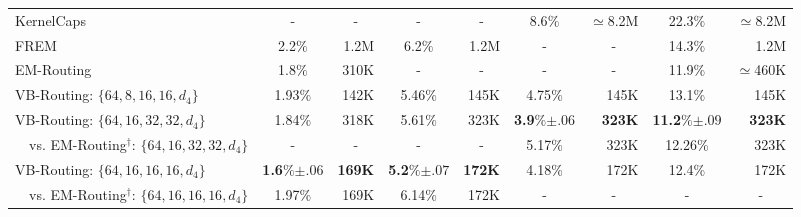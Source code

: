 \documentclass[letterpaper]{article} \usepackage{aaai20}  \usepackage{times}  \usepackage{helvet} \usepackage{courier}  \usepackage[hyphens]{url}  \usepackage{graphicx} \urlstyle{rm} \def\UrlFont{\rm}  \usepackage{graphicx}  \frenchspacing  \setlength{\pdfpagewidth}{8.5in}  \setlength{\pdfpageheight}{11in}  \nocopyright
\begin{document}
\begin{table*}[t]
\begin{tabular}{lcrcrcrcr}
        KernelCaps~\scriptsize{\cite{killian2019kernelized}} & \multicolumn{1}{c}{-} & \multicolumn{1}{c}{-} & \multicolumn{1}{c}{-} & \multicolumn{1}{c}{-} & 8.6$\%$ & $\simeq$8.2M & 22.3$\%$ & $\simeq$8.2M \\
        FREM~\scriptsize{\cite{zhang2018fast}} & 2.2$\%$ & 1.2M & 6.2$\%$ & 1.2M & \multicolumn{1}{c}{-} & \multicolumn{1}{c}{-} & 14.3$\%$ & 1.2M \\
        EM-Routing~\scriptsize{\cite{hinton2018matrix}} & 1.8$\%$ & 310K & \multicolumn{1}{c}{-} & \multicolumn{1}{c}{-} & \multicolumn{1}{c}{-} & \multicolumn{1}{c}{-} & 11.9$\%$ & $\simeq$460K \\
        \midrule
        VB-Routing: $\{64, 8, 
16, 16, d_4\}$ & 1.93$\%$ & 142K & 5.46$\%$ & 145K & 4.75$\%$ & 145K & 13.1$\%$ & 145K  \\
        VB-Routing: $\{64, 16, 
32, 32, d_4\}$ & 1.84$\%$ & 318K & 5.61$\%$ & 323K & \textbf{3.9}$\%$\scriptsize{$\pm.06$} & \textbf{323K} & \textbf{11.2}$\%$\scriptsize{$\pm.09$} & \textbf{323K}  \\
        \ \ vs. EM-Routing$^{\dagger}$: $\{64, 16, 
32, 32, d_4\}$ & - & \multicolumn{1}{c}{-} &  - & \multicolumn{1}{c}{-} & 5.17\% & 323K & 12.26\% & 323K  \\
        VB-Routing: $\{64, 16, 
16, 16, d_4\}$ & \textbf{1.6}$\%$\scriptsize{$\pm.06$} & \textbf{169K} &  \textbf{5.2}$\%$\scriptsize{$\pm.07$} & \textbf{172K} & 4.18\% & 172K & 12.4$\%$ & 172K  \\
        \ \ vs. EM-Routing$^{\dagger}$: $\{64, 16, 
16, 16, d_4\}$ & 1.97$\%$ & 169K &  6.14\% & 172K & - & \multicolumn{1}{c}{-} & - & \multicolumn{1}{c}{-} \\
        \bottomrule
    \end{tabular}
    \label{results table}
\end{table*}
\end{document}
